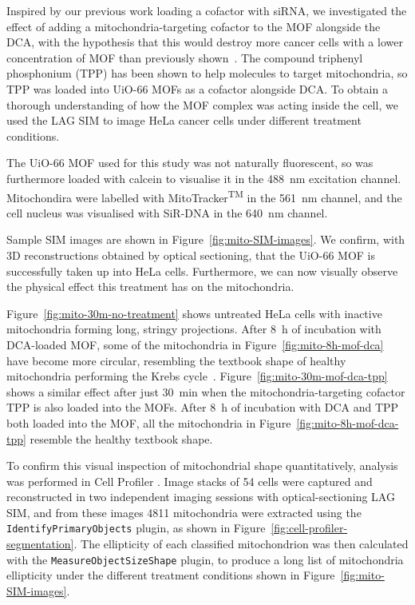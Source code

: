 Inspired by our previous work loading a cofactor with siRNA, we investigated the effect of adding a mitochondria-targeting cofactor to the MOF alongside the DCA, with the hypothesis that this would destroy more cancer cells with a lower concentration of MOF than previously shown~\cite{abanades2018mechanistic}. 
The compound triphenyl phosphonium (TPP) has been shown to help molecules to target mitochondria, so TPP was loaded into UiO-66 MOFs as a cofactor alongside DCA. 
To obtain a thorough understanding of how the MOF complex was acting inside the cell, we used the LAG SIM to image HeLa cancer cells under different treatment conditions. 

The UiO-66 MOF used for this study was not naturally fluorescent, so was furthermore loaded with calcein to visualise it in the \SI{488}{\nano\metre} excitation channel. 
Mitochondira were labelled with MitoTracker\textsuperscript{TM} in the \SI{561}{\nano\metre} channel, and the cell nucleus was visualised with SiR-DNA in the \SI{640}{\nano\metre} channel. 

Sample SIM images are shown in Figure~\ref{fig:mito-SIM-images}. 
We confirm, with 3D reconstructions obtained by optical sectioning, that the UiO-66 MOF is successfully taken up into HeLa cells. 
Furthermore, we can now visually observe the physical effect this treatment has on the mitochondria. 

Figure~\ref{fig:mito-30m-no-treatment} shows untreated HeLa cells with inactive mitochondria forming long, stringy projections. 
After \SI{8}{\hour} of incubation with DCA-loaded MOF, some of the mitochondria in Figure~\ref{fig:mito-8h-mof-dca} have become more circular, resembling the textbook shape of healthy mitochondria performing the Krebs cycle~\cite{murray1993cell}.
Figure~\ref{fig:mito-30m-mof-dca-tpp} shows a similar effect after just \SI{30}{\minute} when the mitochondria-targeting cofactor TPP is also loaded into the MOFs. 
After \SI{8}{\hour} of incubation with DCA and TPP both loaded into the MOF, all the mitochondria in Figure~\ref{fig:mito-8h-mof-dca-tpp} resemble the healthy textbook shape. 

To confirm this visual inspection of mitochondrial shape quantitatively, analysis was performed in Cell Profiler \cite{carpenter2006cellprofiler}.
Image stacks of 54 cells were captured and reconstructed in two independent imaging sessions with optical-sectioning LAG SIM, and from these images \num{4811} mitochondria were extracted using the \texttt{IdentifyPrimaryObjects} plugin, as shown in Figure~\ref{fig:cell-profiler-segmentation}. 
The ellipticity of each classified mitochondrion was then calculated with the \texttt{MeasureObjectSizeShape} plugin, to produce a long list of mitochondria ellipticity under the different treatment conditions shown in Figure~\ref{fig:mito-SIM-images}. 

